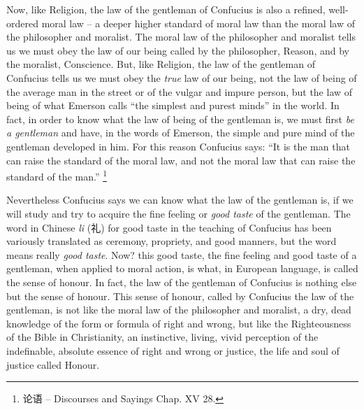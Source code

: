 Now, like Religion, the law of the gentleman of Confucius is also a refined, well-ordered moral law
-- a deeper higher standard of moral law than the moral law of the philosopher and moralist.
The moral law of the philosopher and moralist tells us we must obey the law of our being called by the philosopher, Reason, and by the moralist, Conscience.
But, like Religion, the law of the gentleman of Confucius tells us we must obey the \emph{true} law of our being,
not the law of being of the average man in the street or of the vulgar and impure person,
but the law of being of what Emerson calls ``the simplest and purest minds'' in the world.
In fact, in order to know what the law of being of the gentleman is, we must first \emph{be a gentleman} and have,
in the words of Emerson, the simple and pure mind of the gentleman developed in him.
For this reason Confucius says: ``It is the man that can raise the standard of the moral law, and not the moral law that can raise the standard of the man.'' \footnote{论语 -- Discourses and Sayings Chap. XV 28.}

Nevertheless Confucius says we can know what the law of the gentleman is, if we will study and try to acquire the fine feeling or \emph{good taste} of the gentleman.
The word in Chinese \emph{li} (礼) for good taste in the teaching of Confucius has been variously translated as ceremony, propriety, and good manners, but the word means really \emph{good taste}.
Now? this good taste, the fine feeling and good taste of a gentleman, when applied to moral action, is what, in European language, is called the sense of honour.
In fact, the law of the gentleman of Confucius is nothing else but the sense of honour.
This sense of honour, called by Confucius the law of the gentleman, is not like the moral law of the philosopher and moralist, a dry, dead knowledge of the form or formula of right and wrong, but like the Righteousness of the Bible in Christianity, an instinctive, living, vivid perception of the indefinable, absolute essence of right and wrong or justice, the life and soul of justice called Honour.

